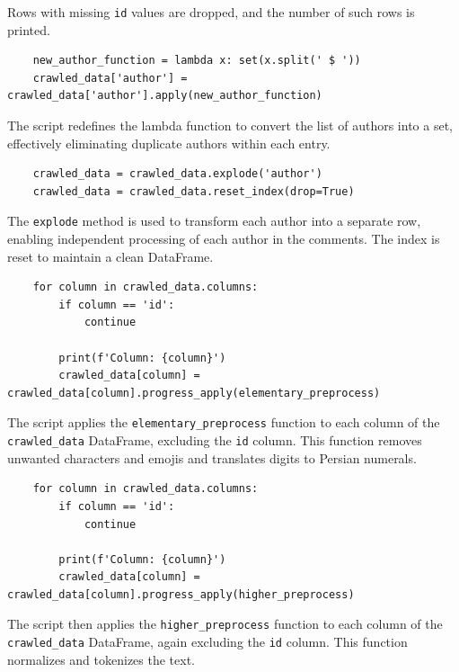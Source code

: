 \documentclass{solutionclass} %
\begin{document}
\begin{solution}
    Rows with missing \texttt{id} values are dropped, and the number of such rows is printed.
    
    \begin{lstlisting}
    new_author_function = lambda x: set(x.split(' $ '))
    crawled_data['author'] = crawled_data['author'].apply(new_author_function)
    \end{lstlisting}
    
    The script redefines the lambda function to convert the list of authors into a set, effectively eliminating duplicate authors within each entry.
    
    \begin{lstlisting}
    crawled_data = crawled_data.explode('author')
    crawled_data = crawled_data.reset_index(drop=True)
    \end{lstlisting}
    
    The \texttt{explode} method is used to transform each author into a separate row, enabling independent processing of each author in the comments. The index is reset to maintain a clean DataFrame.
    
    \begin{lstlisting}
    for column in crawled_data.columns:
        if column == 'id':
            continue
        
        print(f'Column: {column}')
        crawled_data[column] = crawled_data[column].progress_apply(elementary_preprocess)
    \end{lstlisting}
    
    The script applies the \texttt{elementary\_preprocess} function to each column of the \texttt{crawled\_data} DataFrame, excluding the \texttt{id} column. This function removes unwanted characters and emojis and translates digits to Persian numerals.
    
    \begin{lstlisting}
    for column in crawled_data.columns:
        if column == 'id':
            continue
            
        print(f'Column: {column}')
        crawled_data[column] = crawled_data[column].progress_apply(higher_preprocess)
    \end{lstlisting}
    
    The script then applies the \texttt{higher\_preprocess} function to each column of the \texttt{crawled\_data} DataFrame, again excluding the \texttt{id} column. This function normalizes and tokenizes the text.
    



\end{solution}
\end{document}
